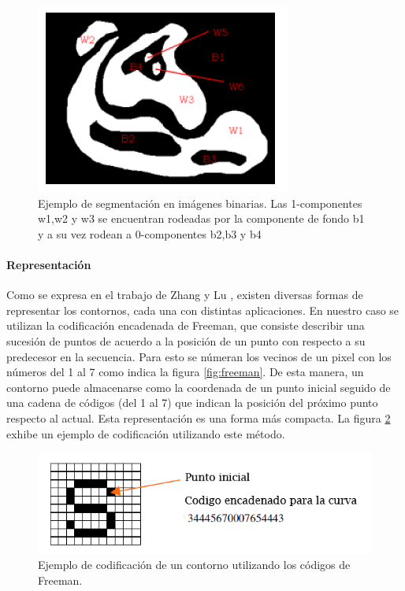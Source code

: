 \begin{figure}[tpb]
\begin{center}
  \includegraphics[scale=0.6]{figuras/zonas-contours.png}
\end{center}
  \caption{\small Ejemplo de segmentación en imágenes binarias. Las 1-componentes w1,w2 y w3 se encuentran rodeadas por la componente de fondo b1 y a su vez
  rodean a 0-componentes b2,b3 y b4 }
  \label{fig:contours}
\end{figure}
	
	
	\paragraph{Representación}
	Como se expresa en el trabajo de Zhang y Lu \cite{Zhang02}, existen diversas formas de representar los contornos, cada una con
	distintas aplicaciones. En nuestro caso se utilizan la codificación encadenada de Freeman, que consiste describir una sucesión de puntos
	de acuerdo a la posición de un punto con respecto a su predecesor en la secuencia. Para esto se númeran los vecinos de un pixel con 
	los números del 1 al 7 como indica la figura \ref{fig:freeman}. De esta manera, un contorno puede almacenarse como la coordenada de
	un punto inicial seguido de una cadena de códigos (del 1 al 7) que indican la posición del próximo punto respecto al actual. Esta 
	representación es una forma más compacta. La figura \ref{fig:freeman_sample} exhibe un 
	ejemplo de codificación utilizando este método.
	
	\begin{figure}[htpb]
\begin{center}
  \includegraphics[scale=0.6]{figuras/freeman-sample.png}
\end{center}	
  \caption{\small Ejemplo de codificación de un contorno utilizando los códigos de Freeman. }
  \label{fig:freeman_sample}
\end{figure}

